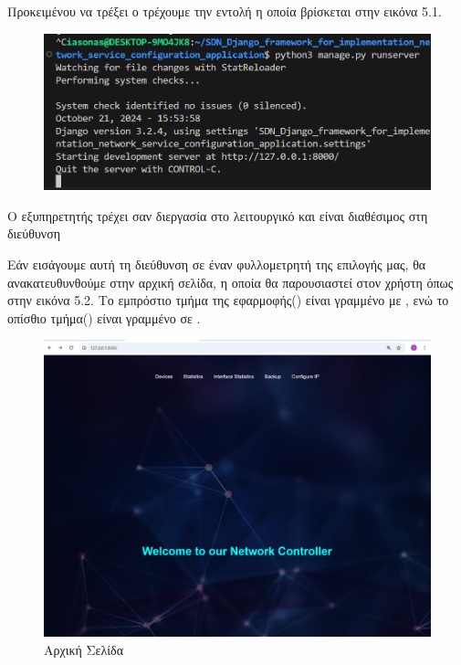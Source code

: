 Προκειμένου να τρέξει ο 
τρέχουμε την εντολή η οποία βρίσκεται στην 
εικόνα 5.1.

\begin{figure}[h]
	\centering
	\includegraphics[width=1.0\textwidth]{graphics/django_server_run.png}
	\caption{ }
\end{figure}






Ο εξυπηρετητής τρέχει σαν διεργασία στο λειτουργικό
και είναι διαθέσιμος στη διεύθυνση 

Εάν εισάγουμε αυτή τη διεύθυνση σε έναν 
φυλλομετρητή της επιλογής μας, θα ανακατευθυνθούμε 
στην αρχική σελίδα, η οποία θα παρουσιαστεί στον 
χρήστη όπως στην εικόνα 5.2. Το εμπρόστιο τμήμα της εφαρμοφής() 
είναι γραμμένο με , ενώ το οπίσθιο τμήμα() 
είναι γραμμένο σε .

\begin{figure}[h]
	\centering
	\includegraphics[width=1.2\textwidth]{graphics/home_page.png}
	\caption{ Αρχική Σελίδα}
\end{figure}

